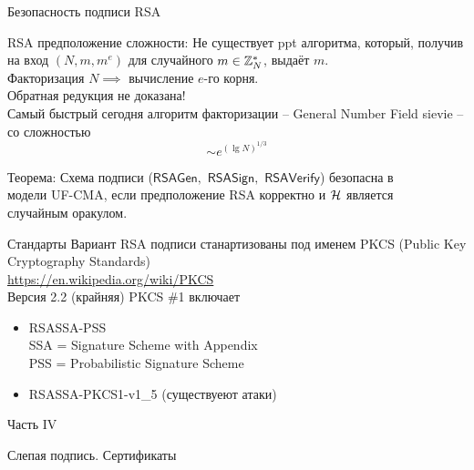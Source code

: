 \documentclass[usenames,dvipsnames,8pt,aspectratio=169]{beamer}
\begin{document}
\begin{frame}{Безопасность подписи RSA}
\Large

{\color{Orange}  RSA предположение сложности:}
Не существует ppt алгоритма, который, получив на вход $(N, m, m^e)$ для случайного $m \in {{\mathbb Z}}_N^\ast$, выдаёт $m$.\\[10pt]

{\centering Факторизация $N \implies $ вычисление $e$-го корня. \\[5pt] Обратная редукция не доказана! }  \\[15pt]

Самый быстрый сегодня алгоритм факторизации -- General Number Field sievie -- со сложностью
\[
\sim e^{(\lg N)^{1/3}}
\]


{\color{Orange}  Теорема:} Схема подписи ($\mathsf{RSAGen},$ $\mathsf{RSASign},$ $\mathsf{RSAVerify}$) безопасна в \\ модели {\color{Orange} UF-CMA}, если {\color{Orange}  предположение RSA корректно} и $\mathcal{H}$ является \\ {\color{Orange}  случайным оракулом.} \\[10pt]

\end{frame}

\begin{frame}{Стандарты}
\Large 
Вариант RSA подписи станартизованы под именем PKCS (Public Key Cryptography Standards)   \\
\url{https://en.wikipedia.org/wiki/PKCS} \\[10pt]

Версия 2.2 (крайняя)  PKCS \#1 включает \\[10pt]
\begin{itemize}
\itemsep10pt
\item RSASSA-PSS \\
SSA = Signature Scheme with Appendix \\[5pt]
PSS =  Probabilistic Signature Scheme
\item  RSASSA-PKCS1-v1\_5 (существуеют атаки)
\end{itemize}

\end{frame}

\begin{frame}
Часть IV \\ [10pt]
\begin{LARGE}
	
	\color{Orange}
	\Huge  Слепая подпись. Сертификаты
	
\end{LARGE}
\end{frame}
\end{document}
